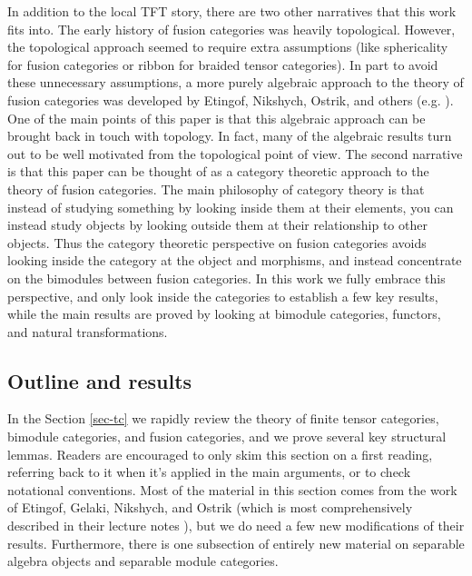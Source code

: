 \documentclass{amsart}
\begin{document}
In addition to the local TFT story, there are two other narratives that this work fits into.  The early history of fusion categories was heavily topological.  However, the topological approach seemed to require extra assumptions (like sphericality for fusion categories or ribbon for braided tensor categories).  In part to avoid these unnecessary assumptions, a more purely algebraic approach to the theory of fusion categories was developed by Etingof, Nikshych, Ostrik, and others (e.g. \cite{EGNO, MR2183279,0906.0620,MR2097289}).   One of the main points of this paper is that this algebraic approach can be brought back in touch with topology.  In fact, many of the algebraic results turn out to be well motivated from the topological point of view.    The second narrative is that this paper can be thought of as a category theoretic approach to the theory of fusion categories.  The main philosophy of category theory is that instead of studying something by looking inside them at their elements, you can instead study objects by looking outside them at their relationship to other objects.  Thus the category theoretic perspective on fusion categories avoids looking inside the category at the object and morphisms, and instead concentrate on the bimodules between fusion categories.  In this work we fully embrace this perspective, and only look inside the categories to establish a few key results, while the main results are proved by looking at bimodule categories, functors, and natural transformations.  

\subsection{Outline and results}

In the Section \ref{sec-tc} we rapidly review the theory of finite tensor categories, bimodule categories, and fusion categories, and we prove several key structural lemmas.  Readers are encouraged to only skim this section on a first reading, referring back to it when it's applied in the main arguments, or to check notational conventions.  Most of the material in this section comes from the work of Etingof, Gelaki, Nikshych, and Ostrik (which is most comprehensively described in their lecture notes \cite{EGNO}), but we do need a few new modifications of their results.  Furthermore, there is one subsection of entirely new material on separable algebra objects and separable module categories.  
\end{document}
